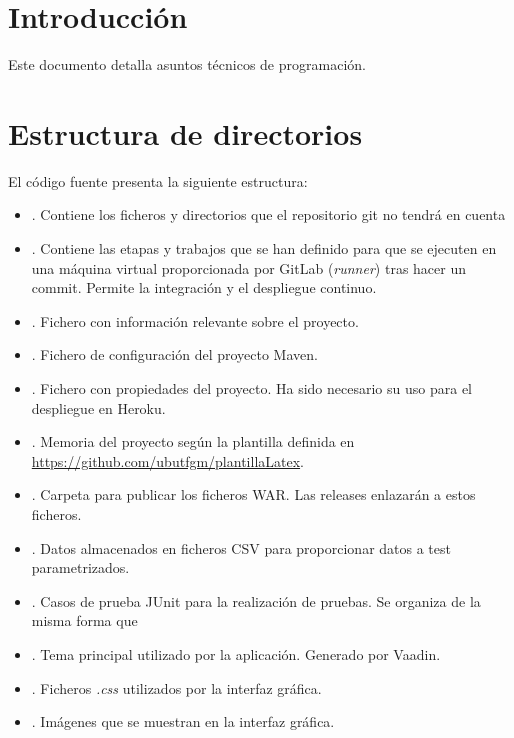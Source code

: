 \label{anex:D}

\section{Introducción}
Este documento detalla asuntos técnicos de programación.

\section{Estructura de directorios}
El código fuente presenta la siguiente estructura:
\begin{itemize}
	\tightlist
	\item {}. Contiene los ficheros y directorios que el repositorio git no tendrá en cuenta
	\item {}. Contiene las etapas y trabajos que se han definido para que se ejecuten en una máquina virtual proporcionada por GitLab (\textit{runner}) tras hacer un commit. Permite la integración y el despliegue continuo.
	\item {}. Fichero con información relevante sobre el proyecto.
	\item {}. Fichero de configuración del proyecto Maven.
	\item {}. Fichero con propiedades del proyecto. Ha sido necesario su uso para el despliegue en Heroku.
	\item {}. Memoria del proyecto según la plantilla definida en \url{https://github.com/ubutfgm/plantillaLatex}.
	\item {}. Carpeta para publicar los ficheros WAR. Las releases enlazarán a estos ficheros.
	\item {}. Datos almacenados en ficheros CSV para proporcionar datos a test parametrizados.
	\item {}. Casos de prueba JUnit para la realización de pruebas. Se organiza de la misma forma que 
	\item {}. Tema principal utilizado por la aplicación. Generado por Vaadin.
	\item {}. Ficheros \textit{.css} utilizados por la interfaz gráfica.
	\item {}. Imágenes que se muestran en la interfaz gráfica.

\end{itemize}
